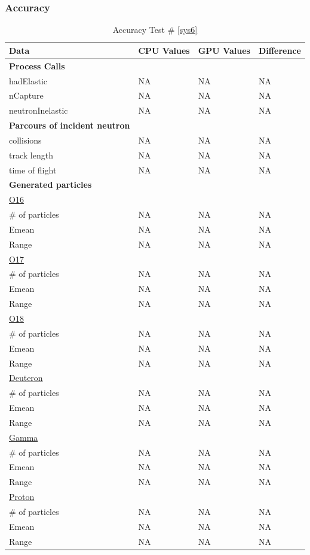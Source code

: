 \documentclass[12pt]{article}
\begin{document}
	\subsubsection{Accuracy}
		\begin{table}[!htbp]
		\centering
		\caption{Accuracy Test \# \ref{sys6}}\label{_acc}
		\begin{tabular}{llll}
		\toprule
		\bf Data & CPU Values & GPU Values & Difference\\\midrule
		\bf Process Calls&&&\\
		hadElastic&NA&NA&NA\\
		nCapture&NA&NA&NA\\
		neutronInelastic&NA&NA&NA\\ 
		\bf Parcours of incident neutron&&&\\
		collisions&NA&NA&NA\\
		track length&NA&NA&NA\\
		time of flight&NA&NA&NA\\
		\bf Generated particles&&&\\
		\underline{O16}&&&\\
		\# of particles&NA&NA&NA\\
		Emean&NA&NA&NA\\
		Range&NA&NA&NA\\
		\underline{O17}&&&\\
		\# of particles&NA&NA&NA\\
		Emean&NA&NA&NA\\
		Range&NA&NA&NA\\
		\underline{O18}&&&\\
		\# of particles&NA&NA&NA\\
		Emean&NA&NA&NA\\
		Range&NA&NA&NA\\
		\underline{Deuteron}&&&\\
		\# of particles&NA&NA&NA\\
		Emean&NA&NA&NA\\
		Range&NA&NA&NA\\
		\underline{Gamma}&&&\\
		\# of particles&NA&NA&NA\\
		Emean&NA&NA&NA\\
		Range&NA&NA&NA\\
		\underline{Proton}&&&\\
		\# of particles&NA&NA&NA\\
		Emean&NA&NA&NA\\
		Range&NA&NA&NA\\
		\end{tabular}
		\end{table}
		\break
\end{document}
